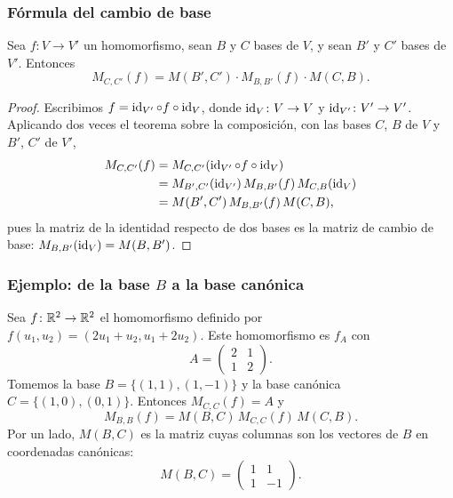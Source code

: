 \begin{frame}
    \frametitle{Fórmula del cambio de base}

    \begin{corollary}
        Sea $f\colon V\to V'$ un homomorfismo, sean $B$ y $C$ bases de $V$,
        y sean $B'$ y $C'$ bases de $V'$. Entonces
        \[
            M_{C,C'}(f)=M(B',C')\cdot M_{B,B'}(f)\cdot M(C,B).
        \]
    \end{corollary}

    \begin{proof}
        Escribimos $f=\operatorname{id}_{V'}\circ f\circ\operatorname{id}_V$, donde
        $\operatorname{id}_V\colon V\to V$ y $\operatorname{id}_{V'}\colon V'\to V'$. Aplicando dos veces
        el teorema sobre la composición, con las bases $C$, $B$ de $V$ y
        $B'$, $C'$ de $V'$,
        \begin{align*}
            M_{C,C'}(f)&=M_{C,C'}(\operatorname{id}_{V'}\circ f\circ\operatorname{id}_V)\\
            &=M_{B',C'}(\operatorname{id}_{V'})\,M_{B,B'}(f)\,M_{C,B}(\operatorname{id}_V)\\
            &=M(B',C')\,M_{B,B'}(f)\,M(C,B),
        \end{align*}
        pues la matriz de la identidad respecto de dos bases es la matriz de
        cambio de base: $M_{B,B'}(\operatorname{id}_V)=M(B,B')$.
    \end{proof}
\end{frame}

\begin{frame}
    \frametitle{Ejemplo: de la base $B$ a la base canónica}

    \begin{example}
        Sea $f\colon\mathbb{R}^2\to\mathbb{R}^2$ el homomorfismo definido por $f(u_1,u_2)=(2u_1+u_2,u_1+2u_2)$. Este homomorfismo es $f_A$ con
        \[
            A=\begin{pmatrix}2&1\\1&2\end{pmatrix}.
        \]
        Tomemos la base $B=\{(1,1),(1,-1)\}$ y la base canónica $C=\{(1,0),(0,1)\}$. Entonces $M_{C,C}(f)=A$ y
        \[
            M_{B,B}(f)=M(B,C)\,M_{C,C}(f)\,M(C,B).
        \] 
        Por un lado, $M(B,C)$ es la matriz cuyas columnas son los vectores de $B$ en coordenadas canónicas:
        \[
            M(B,C)=\begin{pmatrix}1&1\\1&-1\end{pmatrix}.
        \]
    \end{example}
\end{frame}

